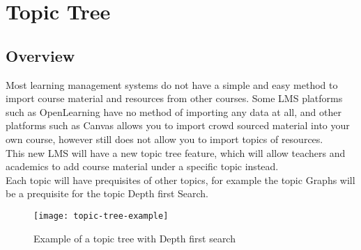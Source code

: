 \section{Topic Tree}
\subsection{Overview}
Most learning management systems do not have a simple and easy method to import course material and resources from other courses. Some LMS platforms such as OpenLearning have no method of importing any data at all, and other platforms such as Canvas allows you to import crowd sourced material into your own course, however still does not allow you to import topics of resources. \\

This new LMS will have a new topic tree feature, which will allow teachers and academics to add course material under a specific topic instead.\\
Each topic will have prequisites of other topics, for example the topic Graphs will be a prequisite for the topic Depth first Search.\\

\begin{figure}[h!]
    \centering
    \texttt{[image: topic-tree-example]}
    \caption{Example of a topic tree with Depth first search}
\end{figure}

